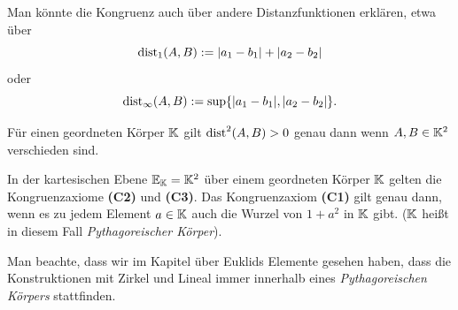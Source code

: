 
Man könnte die Kongruenz auch über andere Distanzfunktionen erklären, etwa über
$$
    \operatorname{dist}_1(A,B) := |a_1 - b_1| + |a_2 - b_2|
$$
oder
$$
    \operatorname{dist}_{\infty}(A,B) := \sup \{ |a_1 - b_1|, |a_2 - b_2| \}.
$$

Für einen geordneten Körper $\mathbb K$ gilt $\operatorname{dist}^2(A,B) > 0$ genau dann wenn $A, B\in \mathbb K^2$ verschieden
sind.

\begin{thm}
    In der kartesischen Ebene $\mathbb E_{\mathbb K} = \mathbb K^2$ über einem geordneten Körper $\mathbb K$ gelten die
    Kongruenzaxiome {\bf (C2)} und  {\bf (C3)}. Das Kongruenzaxiom {\bf (C1)} gilt genau dann, wenn
    es zu jedem Element $a \in \mathbb K$ auch die Wurzel von $1 + a^2$ in $\mathbb K$ gibt. ($\mathbb K$ heißt in diesem
    Fall {\em Pythagoreischer Körper}).
\end{thm}

Man beachte, dass wir im Kapitel über Euklids Elemente gesehen haben, dass die Konstruktionen mit
Zirkel und Lineal immer innerhalb eines {\em Pythagoreischen Körpers} stattfinden.


